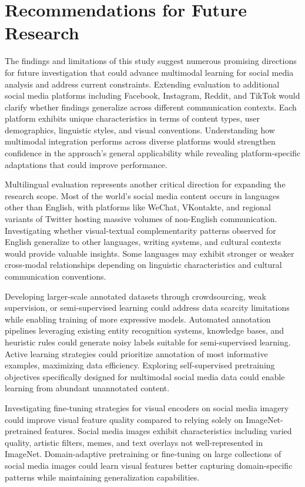 \documentclass[12pt,a4paper]{report}
\begin{document}
\section{Recommendations for Future Research}

The findings and limitations of this study suggest numerous promising directions for future investigation that could advance multimodal learning for social media analysis and address current constraints. Extending evaluation to additional social media platforms including Facebook, Instagram, Reddit, and TikTok would clarify whether findings generalize across different communication contexts. Each platform exhibits unique characteristics in terms of content types, user demographics, linguistic styles, and visual conventions. Understanding how multimodal integration performs across diverse platforms would strengthen confidence in the approach's general applicability while revealing platform-specific adaptations that could improve performance.

Multilingual evaluation represents another critical direction for expanding the research scope. Most of the world's social media content occurs in languages other than English, with platforms like WeChat, VKontakte, and regional variants of Twitter hosting massive volumes of non-English communication. Investigating whether visual-textual complementarity patterns observed for English generalize to other languages, writing systems, and cultural contexts would provide valuable insights. Some languages may exhibit stronger or weaker cross-modal relationships depending on linguistic characteristics and cultural communication conventions.

Developing larger-scale annotated datasets through crowdsourcing, weak supervision, or semi-supervised learning could address data scarcity limitations while enabling training of more expressive models. Automated annotation pipelines leveraging existing entity recognition systems, knowledge bases, and heuristic rules could generate noisy labels suitable for semi-supervised learning. Active learning strategies could prioritize annotation of most informative examples, maximizing data efficiency. Exploring self-supervised pretraining objectives specifically designed for multimodal social media data could enable learning from abundant unannotated content.

Investigating fine-tuning strategies for visual encoders on social media imagery could improve visual feature quality compared to relying solely on ImageNet-pretrained features. Social media images exhibit characteristics including varied quality, artistic filters, memes, and text overlays not well-represented in ImageNet. Domain-adaptive pretraining or fine-tuning on large collections of social media images could learn visual features better capturing domain-specific patterns while maintaining generalization capabilities.
\end{document}
